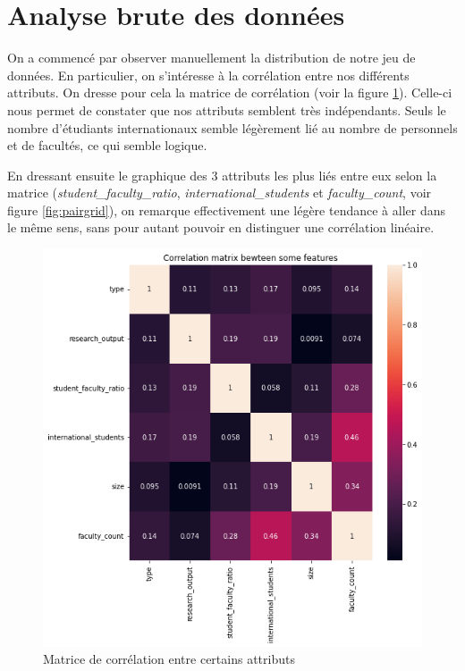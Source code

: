 \documentclass[twocolumns]{udes_rapport}
\begin{document}
\section{Analyse brute des données}\label{sec:raw_analysis}

    On a commencé par observer manuellement la distribution de notre jeu de données. En particulier, on s'intéresse à la corrélation entre nos différents attributs. On dresse pour cela la matrice de corrélation (voir la figure \ref{fig:corr_matrix}). Celle-ci nous permet de constater que nos attributs semblent très indépendants. Seuls le nombre d'étudiants internationaux semble légèrement lié au nombre de personnels et de facultés, ce qui semble logique.
    
    En dressant ensuite le graphique des 3 attributs les plus liés entre eux selon la matrice (\emph{student\_faculty\_ratio}, \emph{international\_students} et \emph{faculty\_count}, voir figure \ref{fig:pairgrid}), on remarque effectivement une légère tendance à aller dans le même sens, sans pour autant pouvoir en distinguer une corrélation linéaire.
    
    \begin{figure}[h!]
        \centering
        \includegraphics[scale=0.45]{Images/corr_matrix.png}
        \caption{Matrice de corrélation entre certains attributs}
        \label{fig:corr_matrix}
    \end{figure}
    
\end{document}
